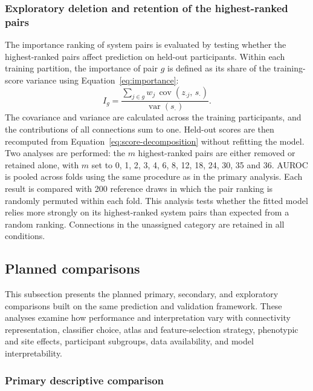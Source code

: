 \subsubsection{Exploratory deletion and retention of the highest-ranked pairs}
\label{subsubsec:deletion-retention}

The importance ranking of system pairs is evaluated by testing whether the highest-ranked pairs affect prediction on held-out participants. Within each training partition, the importance of pair $g$ is defined as its share of the training-score variance using Equation~\eqref{eq:importance}:
\begin{equation}
I_g
=
\frac{\sum_{j\in g} w_j\,\operatorname{cov}\!\left(z_{\cdot j},\, s_{\cdot}\right)}{\operatorname{var}\!\left(s_{\cdot}\right)}.
\label{eq:importance}
\end{equation}
The covariance and variance are calculated across the training participants, and the contributions of all connections sum to one. Held-out scores are then recomputed from Equation~\eqref{eq:score-decomposition} without refitting the model. Two analyses are performed: the $m$ highest-ranked pairs are either removed or retained alone, with $m$ set to 0, 1, 2, 3, 4, 6, 8, 12, 18, 24, 30, 35 and 36. AUROC is pooled across folds using the same procedure as in the primary analysis. Each result is compared with 200 reference draws in which the pair ranking is randomly permuted within each fold. This analysis tests whether the fitted model relies more strongly on its highest-ranked system pairs than expected from a random ranking. Connections in the unassigned category are retained in all conditions.

\subsection{Planned comparisons}
\label{subsec:planned-comparisons}
This subsection presents the planned primary, secondary, and exploratory comparisons built on the same prediction and validation framework. These analyses examine how performance and interpretation vary with connectivity representation, classifier choice, atlas and feature-selection strategy, phenotypic and site effects, participant subgroups, data availability, and model interpretability. 

\subsubsection{Primary descriptive comparison}
\label{subsubsec:primary-comparisons}


